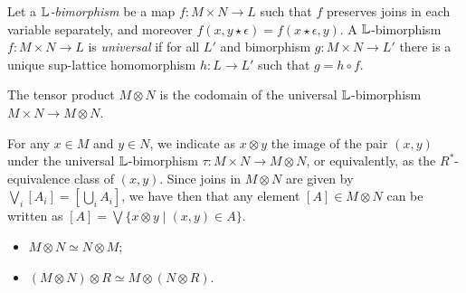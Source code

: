 Let a \emph{$\mathbb{L}$-bimorphism} be a map $f:M\times N\to L$ such that $f$ preserves joins in each variable separately, and moreover $f(x,y\star \epsilon)=f(x\star\epsilon,y)$. A $\mathbb{L}$-bimorphism $f:M\times N\to L$ is \emph{universal} if for all $L'$ and bimorphism $g:M\times N\to L'$ there is a unique sup-lattice homomorphism $h:L\to L'$ such that $g=h\circ f$.

\begin{proposition}
The tensor product $M\otimes N$ is the codomain of the universal $\mathbb{L}$-bimorphism $M\times N \to M\otimes N$.
\end{proposition}


\begin{remark}

For any $x\in M$ and $y\in N$, we indicate as $x\otimes y$ the image of the pair $(x,y)$ under the universal $\mathbb{L}$-bimorphism $\tau:M\times N\to M\otimes N$, or equivalently, as the $R^{*}$-equivalence class of $(x,y)$.
Since joins in $M\otimes N$ are given by  
$\bigvee_{i}[A_{i}]= [\bigcup_{i}A_{i}]$, we have then 
that any element $[A]\in M\otimes N$ can be written as 
$[A]= \bigvee\{x\otimes y\mid (x,y)\in A\}$.

%
\end{remark}



\begin{lemma}
\begin{itemize}
\item $M\otimes N\simeq N\otimes M$;

\item $(M\otimes N)\otimes R \simeq M\otimes (N\otimes R)$.
\end{itemize}
\end{lemma}

